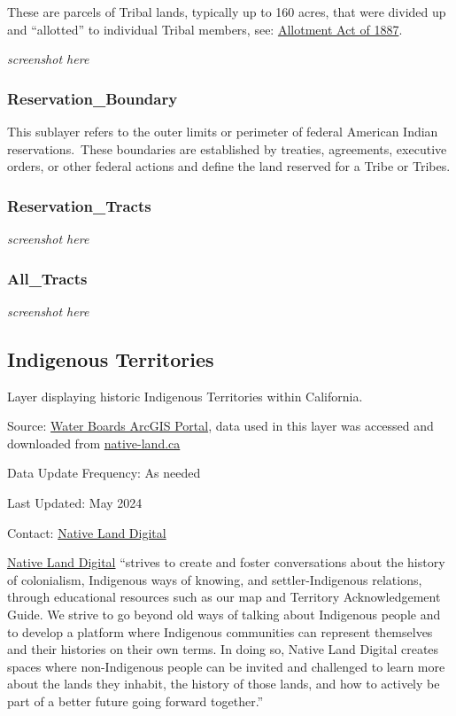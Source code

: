 \documentclass[
  letterpaper,
  DIV=11,
  numbers=noendperiod]{scrreprt}
\begin{document}
These are parcels of Tribal lands, typically up to 160 acres, that were
divided up and ``allotted'' to individual Tribal members, see:
\href{https://www.bia.gov/bia/history/history-indian-land-consolidation\#:~:text=In\%201887\%2C\%20Congress\%20enacted\%20the,allotted\%E2\%80\%9D\%20to\%20individual\%20Tribal\%20members.}{Allotment
Act of 1887}.~

\emph{screenshot here}

\subsubsection{Reservation\_Boundary}\label{reservation_boundary}

This sublayer refers to the outer limits or perimeter of federal
American Indian reservations.~These boundaries are established by
treaties, agreements, executive orders, or other federal actions and
define the land reserved for a Tribe or Tribes.

\subsubsection{Reservation\_Tracts}\label{reservation_tracts}

\emph{screenshot here}

\subsubsection{All\_Tracts}\label{all_tracts}

\emph{screenshot here}

\subsection{Indigenous Territories}\label{indigenous-territories}

Layer displaying historic Indigenous Territories within California.

Source:
\href{https://gispublic.waterboards.ca.gov/portal/home/item.html?id=c21e3128ad4b4f68b041420c3f19c4c8}{Water
Boards ArcGIS Portal}, data used in this layer was accessed and
downloaded from \href{https://native-land.ca/}{native-land.ca}

Data Update Frequency: As needed

Last Updated: May 2024

Contact: \href{https://native-land.ca/contact}{Native Land Digital}

\href{https://native-land.ca/about/why-it-matters}{Native Land Digital}
``strives to create and foster conversations about the history of
colonialism, Indigenous ways of knowing, and settler-Indigenous
relations, through educational resources such as our map and Territory
Acknowledgement Guide. We strive to go beyond old ways of talking about
Indigenous people and to develop a platform where Indigenous communities
can represent themselves and their histories on their own terms. In
doing so, Native Land Digital creates spaces where non-Indigenous people
can be invited and challenged to learn more about the lands they
inhabit, the history of those lands, and how to actively be part of a
better future going forward together.''
\end{document}
